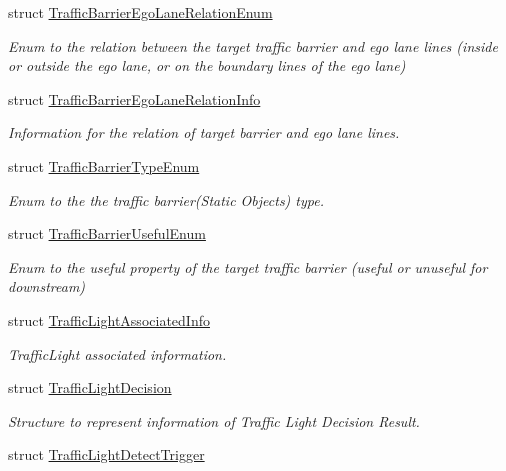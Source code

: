 \begin{DoxyCompactItemize}
struct \hyperlink{structmaf__perception__interface_1_1TrafficBarrierEgoLaneRelationEnum}{Traffic\+Barrier\+Ego\+Lane\+Relation\+Enum}
\begin{DoxyCompactList}\small\item\em Enum to the relation between the target traffic barrier and ego lane lines (inside or outside the ego lane, or on the boundary lines of the ego lane) \end{DoxyCompactList}\item 
struct \hyperlink{structmaf__perception__interface_1_1TrafficBarrierEgoLaneRelationInfo}{Traffic\+Barrier\+Ego\+Lane\+Relation\+Info}
\begin{DoxyCompactList}\small\item\em Information for the relation of target barrier and ego lane lines. \end{DoxyCompactList}\item 
struct \hyperlink{structmaf__perception__interface_1_1TrafficBarrierTypeEnum}{Traffic\+Barrier\+Type\+Enum}
\begin{DoxyCompactList}\small\item\em Enum to the the traffic barrier(\+Static Objects) type. \end{DoxyCompactList}\item 
struct \hyperlink{structmaf__perception__interface_1_1TrafficBarrierUsefulEnum}{Traffic\+Barrier\+Useful\+Enum}
\begin{DoxyCompactList}\small\item\em Enum to the useful property of the target traffic barrier (useful or unuseful for downstream) \end{DoxyCompactList}\item 
struct \hyperlink{structmaf__perception__interface_1_1TrafficLightAssociatedInfo}{Traffic\+Light\+Associated\+Info}
\begin{DoxyCompactList}\small\item\em Traffic\+Light associated information. \end{DoxyCompactList}\item 
struct \hyperlink{structmaf__perception__interface_1_1TrafficLightDecision}{Traffic\+Light\+Decision}
\begin{DoxyCompactList}\small\item\em Structure to represent information of Traffic Light Decision Result. \end{DoxyCompactList}\item 
struct \hyperlink{structmaf__perception__interface_1_1TrafficLightDetectTrigger}{Traffic\+Light\+Detect\+Trigger}

\end{DoxyCompactItemize}
